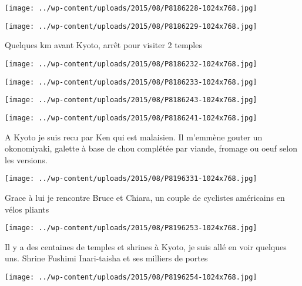  \newline
 \newline
\centerline{\texttt{[image: ../wp-content/uploads/2015/08/P8186228-1024x768.jpg]} } 
 \newline
 \newline
\centerline{\texttt{[image: ../wp-content/uploads/2015/08/P8186229-1024x768.jpg]} } 
 \newline
 Quelques km avant Kyoto, arrêt pour visiter 2 temples \newline
 \newline
\centerline{\texttt{[image: ../wp-content/uploads/2015/08/P8186232-1024x768.jpg]} } 
 \newline
 \newline
\centerline{\texttt{[image: ../wp-content/uploads/2015/08/P8186233-1024x768.jpg]} } 
 \newline
 \newline
\centerline{\texttt{[image: ../wp-content/uploads/2015/08/P8186243-1024x768.jpg]} } 
 \newline
 \newline
\centerline{\texttt{[image: ../wp-content/uploads/2015/08/P8186241-1024x768.jpg]} } 
 \newline
 A Kyoto je suis recu par Ken qui est malaisien. \newline
 Il m'emmène gouter un okonomiyaki, galette à base de chou complétée par viande, fromage ou oeuf selon les versions. \newline
 \newline
\centerline{\texttt{[image: ../wp-content/uploads/2015/08/P8196331-1024x768.jpg]} } 
 \newline
 Grace à lui je rencontre Bruce et Chiara, un couple de cyclistes américains en vélos pliants \newline
 \newline
\centerline{\texttt{[image: ../wp-content/uploads/2015/08/P8196253-1024x768.jpg]} } 
 \newline
 Il y a des centaines de temples et shrines à Kyoto, je suis allé en voir quelques uns. \newline
 Shrine Fushimi Inari-taisha et ses milliers de portes \newline
 \newline
\centerline{\texttt{[image: ../wp-content/uploads/2015/08/P8196254-1024x768.jpg]} } 
 \newline

